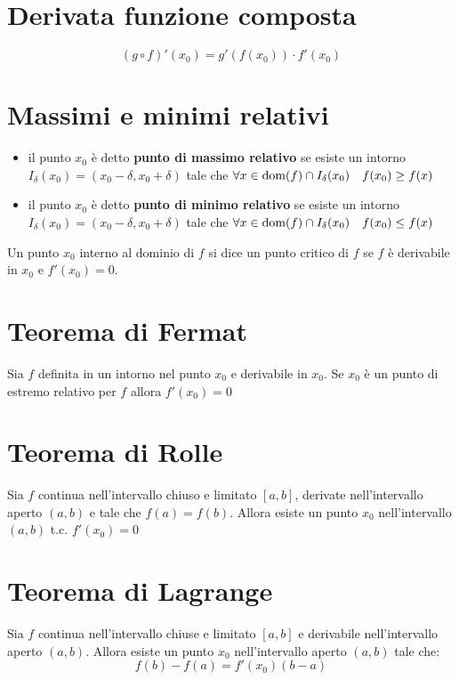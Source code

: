\documentclass[12pt, a4paper]{report}
\begin{document}
    \section{Derivata funzione composta}
    \begin{equation*}
        (g\circ f)'(x_{0})=g'(f(x_{0}))\cdot f'(x_{0})
    \end{equation*}
    \section{Massimi e minimi relativi}
    \begin{itemize}
        \item il punto $x_{0}$ è detto \textbf{punto di massimo relativo} se esiste un intorno $I_{\delta}(x_{0})=(x_{0}-\delta, x_{0}+\delta)$ tale che $\forall x \in \text{dom}(f)\cap I_{\delta}(x_{0}) \quad f(x_{0})\geq f(x)$
        \item il punto $x_{0}$ è detto \textbf{punto di minimo relativo} se esiste un intorno $I_{\delta}(x_{0})=(x_{0}-\delta, x_{0}+\delta)$ tale che $\forall x \in \text{dom}(f)\cap I_{\delta}(x_{0}) \quad f(x_{0})\leq f(x)$
    \end{itemize}
    Un punto $x_{0}$ interno al dominio di $f$ si dice un punto critico di $f$ se $f$ è derivabile in $x_{0}$ e $f'(x_{0})=0$.
    \section{Teorema di Fermat}
    Sia $f$ definita in un intorno nel punto $x_{0}$ e derivabile in $x_{0}$. Se $x_{0}$ è un punto di estremo relativo per $f$ allora $f'(x_{0})=0$
    \section{Teorema di Rolle}
    Sia $f$ continua nell'intervallo chiuso e limitato $[a,b]$, derivate nell'intervallo aperto $(a,b)$ e tale che $f(a)=f(b)$. Allora esiste un punto $x_{0}$ nell'intervallo $(a,b)$ t.c. $f'(x_{0})=0$
    \section{Teorema di Lagrange}
    Sia $f$ continua nell'intervallo chiuse e limitato $[a,b]$ e derivabile nell'intervallo aperto $(a,b)$. Allora esiste un punto $x_{0}$ nell'intervallo aperto $(a,b)$ tale che:
    \begin{equation*}
        f(b)-f(a)=f'(x_{0})(b-a)
    \end{equation*}
\end{document}
